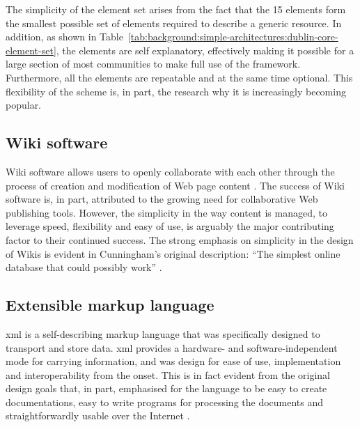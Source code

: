 \tablespacing

\bodyspacing

The simplicity of the element set arises from the fact that the 15 elements form the smallest possible set of elements required to describe a generic resource. In addition, as shown in Table~\ref{tab:background:simple-architectures:dublin-core-element-set}, the elements are self explanatory, effectively making it possible for a large section of most communities to make full use of the framework. Furthermore, all the elements are repeatable and at the same time optional. This flexibility of the scheme is, in part, the research why it is increasingly becoming popular.

\subsection[Wikis]{Wiki software}
\label{sec:background:simple-architectures:wiki-software}

Wiki software allows users to openly collaborate with each other through the process of creation and modification of Web page content \citep{Leuf2001}. The success of Wiki software is, in part, attributed to the growing need for collaborative Web publishing tools. However, the simplicity in the way content is managed, to leverage speed, flexibility and easy of use, is arguably the major contributing factor to their continued success. The strong emphasis on simplicity in the design of Wikis is evident in Cunningham's original description: ``The simplest online database that could possibly work'' \citep{Ward1995,Leuf2001}.

\subsection[XML]{Extensible markup language}
\label{sec:background:simple-architectures:extensible-markup-language}

\gls{xml} is a self-describing markup language that was specifically designed to transport and store data. \gls{xml} provides a hardware- and software-independent mode for carrying information, and was design for ease of use, implementation and interoperability from the onset. This is in fact evident from the original design goals that, in part, emphasised for the language to be easy to create documentations, easy to write programs for processing the documents and straightforwardly usable over the Internet \citep{Bray2008}.

